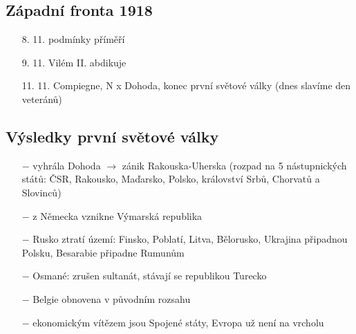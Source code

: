 \documentclass{article}
\begin{document}
\subsection*{Západní fronta 1918}
\begin{itemize}
    \vspace{-0.5em}
    \setlength\itemsep{0.15em}
    \item[8. 11.]  podmínky příměří
    \item[9. 11.]  Vilém II. abdikuje
    \item[11. 11.]  Compiegne, N x Dohoda, konec první světové války (dnes slavíme den veteránů)
\end{itemize}

\subsection*{Výsledky první světové války}
\begin{itemize}
    \vspace{-0.5em}
    \setlength\itemsep{0.15em}
    \item[$-$] vyhrála Dohoda $\rightarrow$ zánik Rakouska-Uherska (rozpad na 5 nástupnických států: ČSR, Rakousko, Maďarsko, Polsko, království Srbů, Chorvatů a Slovinců)
    \item[$-$] z Německa vznikne Výmarská republika
    \item[$-$] Rusko ztratí území: Finsko, Poblatí, Litva, Bělorusko, Ukrajina připadnou Polsku, Besarabie připadne Rumunům
    \item[$-$] Osmané: zrušen sultanát, stávají se republikou Turecko
    \item[$-$] Belgie obnovena v původním rozsahu
    \item[$-$] ekonomickým vítězem jsou Spojené státy, Evropa už není na vrcholu
\end{itemize}
\end{document}
